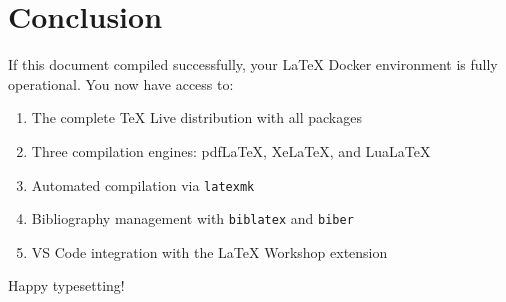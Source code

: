 \section{Conclusion}
\label{sec:conclusion}

If this document compiled successfully, your \LaTeX{} Docker environment is
fully operational. You now have access to:

\begin{enumerate}
    \item The complete TeX Live distribution with all packages
    \item Three compilation engines: pdfLaTeX, XeLaTeX, and LuaLaTeX
    \item Automated compilation via \texttt{latexmk}
    \item Bibliography management with \texttt{biblatex} and \texttt{biber}
    \item VS Code integration with the LaTeX Workshop extension
\end{enumerate}

Happy typesetting!
